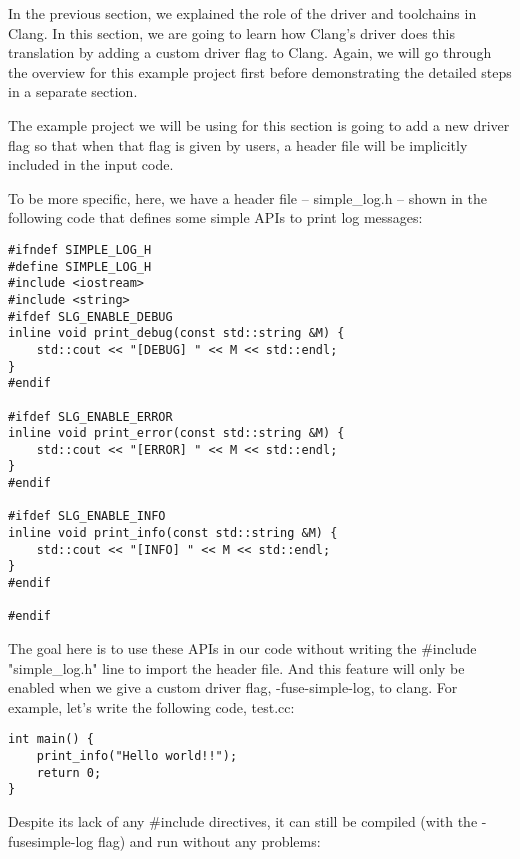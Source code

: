 
In the previous section, we explained the role of the driver and toolchains in Clang. In this section, we are going to learn how Clang's driver does this translation by adding a custom driver flag to Clang. Again, we will go through the overview for this example project first before demonstrating the detailed steps in a separate section.


The example project we will be using for this section is going to add a new driver flag so that when that flag is given by users, a header file will be implicitly included in the input code.

To be more specific, here, we have a header file – simple\_log.h – shown in the following code that defines some simple APIs to print log messages:

\begin{lstlisting}[style=styleCXX]
#ifndef SIMPLE_LOG_H
#define SIMPLE_LOG_H
#include <iostream>
#include <string>
#ifdef SLG_ENABLE_DEBUG
inline void print_debug(const std::string &M) {
	std::cout << "[DEBUG] " << M << std::endl;
}
#endif

#ifdef SLG_ENABLE_ERROR
inline void print_error(const std::string &M) {
	std::cout << "[ERROR] " << M << std::endl;
}
#endif

#ifdef SLG_ENABLE_INFO
inline void print_info(const std::string &M) {
	std::cout << "[INFO] " << M << std::endl;
}
#endif

#endif
\end{lstlisting}

The goal here is to use these APIs in our code without writing the \#include "simple\_log.h" line to import the header file. And this feature will only be enabled when we give a custom driver flag, -fuse-simple-log, to clang. For example, let's write the following code, test.cc:

\begin{lstlisting}[style=styleCXX]
int main() {
	print_info("Hello world!!");
	return 0;
}
\end{lstlisting}

Despite its lack of any \#include directives, it can still be compiled (with the -fusesimple-log flag) and run without any problems:


